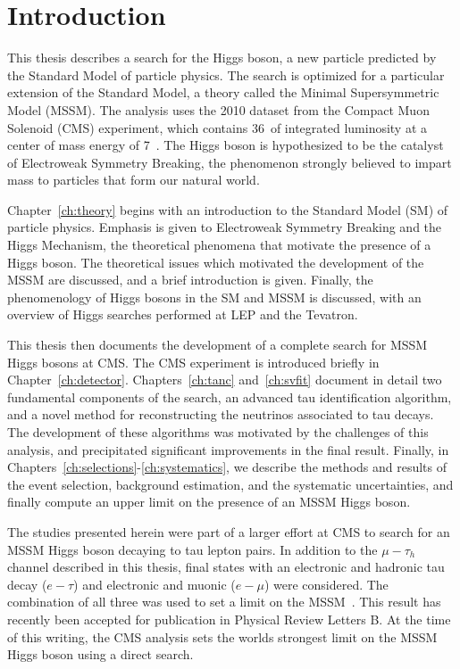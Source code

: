 \ifx\master\undefined\fi
\chapter*{Introduction} 

This thesis describes a search for the Higgs boson, a new particle predicted by
the Standard Model of particle physics.  The search is optimized for a
particular extension of the Standard Model, a theory called the Minimal
Supersymmetric Model (MSSM).  The analysis uses the 2010 dataset from the
Compact Muon Solenoid (CMS) experiment, which contains 36~\pbinv of integrated
luminosity at a center of mass energy of 7~\TeV.  The Higgs boson is
hypothesized to be the catalyst of Electroweak Symmetry Breaking, the phenomenon
strongly believed to impart mass to particles that form our natural world.

Chapter~\ref{ch:theory} begins with an introduction to the Standard Model (SM) of
particle physics. Emphasis is given to Electroweak Symmetry
Breaking and the Higgs Mechanism, the theoretical phenomena that motivate the
presence of a Higgs boson.  The theoretical issues which motivated the
development of the MSSM are discussed, and a brief introduction is given.
Finally, the phenomenology of Higgs bosons in the SM and MSSM is discussed, with
an overview of Higgs searches performed at LEP and the Tevatron.

This thesis then documents the development of a complete search for MSSM Higgs
bosons at CMS\@.  The CMS experiment is introduced briefly in
Chapter~\ref{ch:detector}. Chapters~\ref{ch:tanc} and~\ref{ch:svfit} document in
detail two fundamental components of the search, an advanced tau identification
algorithm, and a novel method for reconstructing the neutrinos associated to tau
decays.  The development of these algorithms was motivated by the challenges of
this analysis, and precipitated significant improvements in the final result.
Finally, in \mbox{Chapters~\ref{ch:selections}-\ref{ch:systematics}}, we
describe the methods and results of the event selection, background estimation,
and the systematic uncertainties, and finally compute an upper limit on the
presence of an MSSM Higgs boson.

The studies presented herein were part of a larger effort at CMS to search for
an MSSM Higgs boson decaying to tau lepton pairs.  In addition to the
$\mu-\tau_h$ channel described in this thesis, final states with an electronic
and hadronic tau decay ($e-\tau$) and electronic and muonic ($e-\mu$) were
considered.  The combination of all three was used to set a limit on the
MSSM~\cite{HIG-10-002}.  This result has recently been accepted for publication
in Physical Review Letters B.  At the time of this writing, the CMS analysis
sets the worlds strongest limit on the MSSM Higgs boson using a direct search.
%
\ifx\master\undefined\fi
